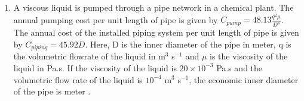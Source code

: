 \documentclass[journal,12pt,onecolumn]{IEEEtran}
\theoremstyle{remark}
\begin{document}
\begin{enumerate}
 

\item A viscous liquid is pumped through a pipe network in a chemical plant. The annual pumping cost per unit length of pipe is given by $C_{pump} = 48.13 \frac{q^2\mu}{D^4}$. The annual cost of the installed piping system per unit length of pipe is given by $C_{piping} = 45.92D$. Here, D is the inner diameter of the pipe in meter, q is the volumetric flowrate of the liquid in m$^3$ s$^{-1}$ and $\mu$ is the viscosity of the liquid in Pa.s. If the viscosity of the liquid is $20 \times 10^{-3}$ Pa.s and the volumetric flow rate of the liquid is $10^{-4}$ m$^3$ s$^{-1}$, the economic inner diameter of the pipe is \underline{\hspace{2cm}} meter .
\hfill{}


\end{enumerate}
\end{document}
